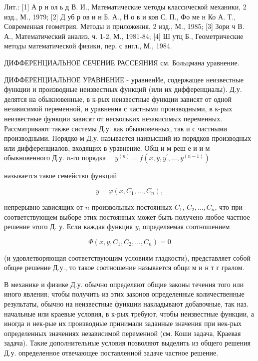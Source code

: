 \documentclass[10pt]{article}
\begin{document}
Лит.: [1] А р н ол ь д В. И., Математические методы классической механики, 2 изд., М., 1979; [2] Д уб р ов и н Б. А., Н о в и ков С. П., Фо ме н Ко А. Т., Современная геометрия. Методы и приложения, 2 изд., М., 1985; [3] Зори ч В. А., Математический анализ, ч. 1-2, М., 1981-84; [4] Ш утц Б., Геометрические методы математической физики, пер. с англ., М., 1984.



ДИФФЕРЕНЦИАЛЬНОЕ СЕЧЕНИЕ РАССЕЯНИЯ см. Больцмана уравнение.



ДИФФЕРЕНЦИАЛЬНОЕ УРАВНЕНИЕ - уравненИе, содержащее неизвестные функции и производные неизвестных функций (или их дифференциалы). Д.у. делятся на обыкновенные, в к-рых неизвестные функции зависят от одной независимой переменной, и уравнения с частными производными, в к-рых неизвестные функции зависят от нескольких независимых переменных. Рассматривают также системы Д.у. как обыкновенных, так и с частными производными. Порядко м Д.у. называется наивысший из порядков производных или дифференциалов, входящих в уравнение. Общ и м реш е и и м обыкновенного Д.у. $n$-го порядка $\quad y^{(n)}=f\left(x, y, y^{\prime}, \ldots, y^{(n-1)}\right)$



называется такое семейство функций



\[

y=\varphi\left(x, C_{1}, \ldots, C_{n}\right),

\]



непрерывно зависящих от $n$ произвольных постоянных $C_{1}$, $C_{2}, \ldots, C_{n}$, что при соответствующем выборе этих постоянных может быть получено любое частное решение этого Д. у. Если каждая функция $y$, определяемая соотношением



\[

\Phi\left(x, y, C_{1}, C_{2}, \ldots, C_{n}\right)=0

\]



(и удовлетворяющая соответствующим условиям гладкости), представляет собой общее решение Д.у., то такое соотношение называется общи м и н т г гралом.



В механике и физике Д.у. обычно определяют общие законы течения того или иного явления; чтобы получить из этих законов определенные количественные результаты, обычно на неизвестные функции накладывают добавочные, так наз. начальные или краевые условия, в к-рых требуют, чтобы неизвестные функции, а иногда и нек-рые их производные принимали заданные значения при нек-рых определенных значениях независимой переменной (см. Коши задача, Краевая задача). Такие дополнительные условия позволяют выделить из общего решения Д.у. определенное отвечающее поставленной задаче частное решение.
\end{document}
